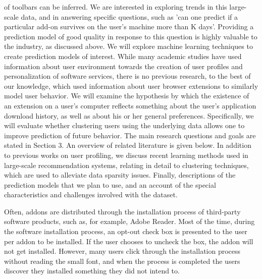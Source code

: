 \documentclass[11pt,oneside]{book}
\begin{document}
of toolbars can be inferred. We are interested in exploring trends in this large-scale data, and in answering specific questions, such as 'can one predict if a particular add-on survives on the user's machine
more than K days'. Providing a prediction model of good quality in response to this question is highly valuable to the industry, as discussed above. We will explore machine learning techniques to create prediction models of interest. While many academic studies have used information about user environment towards the creation of user
profiles and personalization of software services, there is no previous research, to the best of our knowledge, which used information about user browser extensions to similarly model user behavior. We will examine the hypothesis by which the existence of an extension on a user’s computer reflects something about the user's
application download history, as well as about his or her general preferences. Specifically, we will evaluate whether clustering users using the underlying data allows one to improve prediction of future behavior. The main research questions and goals are stated in Section 3. An overview of related literature is given below. In addition to previous works on user profiling, we discuss recent learning methods used in large-scale recommendation systems, relating in detail to clustering techniques, which are used to alleviate data sparsity
issues. Finally, descriptions of the prediction models that we plan to use, and an account of the special characteristics and challenges involved with the dataset.\fi

Often, addons are distributed through the installation process of third-party software products, such as, for example, Adobe Reader. Most of the time, during the software installation process, an opt-out check box is presented to the user per addon to be installed. If the user chooses to uncheck the box, the addon will not get installed. However, many users click through the installation process without reading the small font, and when the process is completed the users discover they installed something they did not intend to. 
\end{document}
